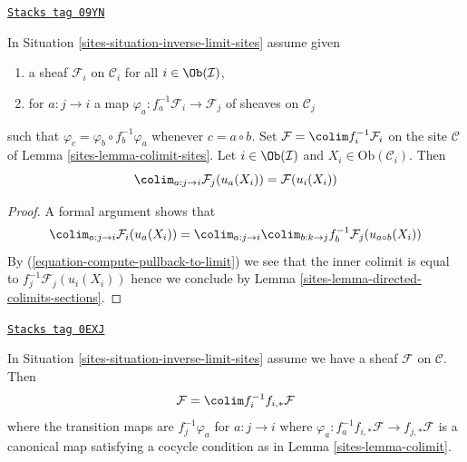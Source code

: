 \begin{lemma}[Colimit]
\label{sites-lemma-colimit}
\href{https://stacks.math.columbia.edu/tag/09YN}{\texttt{Stacks tag 09YN}}

In Situation \ref{sites-situation-inverse-limit-sites} assume given
\begin{enumerate}
\item a sheaf $\mathcal{F}_i$ on $\mathcal{C}_i$ for all
$i \in \Ob(\mathcal{I})$,
\item for $a : j \to i$ a map
$\varphi_a : f_a^{-1}\mathcal{F}_i \to \mathcal{F}_j$
of sheaves on $\mathcal{C}_j$
\end{enumerate}
such that $\varphi_c = \varphi_b \circ f_b^{-1}\varphi_a$
whenever $c = a \circ b$. Set $\mathcal{F} = \colim f_i^{-1}\mathcal{F}_i$
on the site $\mathcal{C}$ of Lemma \ref{sites-lemma-colimit-sites}.
Let $i \in \Ob(\mathcal{I})$ and $X_i \in \text{Ob}(\mathcal{C}_i)$. Then
$$
\colim_{a : j \to i} \mathcal{F}_j(u_a(X_i)) = \mathcal{F}(u_i(X_i))
$$
\end{lemma}

\begin{proof}

A formal argument shows that
$$
\colim_{a : j \to i} \mathcal{F}_i(u_a(X_i)) =
\colim_{a : j \to i} \colim_{b : k \to j}
f_b^{-1}\mathcal{F}_j(u_{a \circ b}(X_i))
$$
By (\ref{equation-compute-pullback-to-limit})
we see that the inner colimit is equal to
$f_j^{-1}\mathcal{F}_j(u_i(X_i))$ hence we conclude by
Lemma \ref{sites-lemma-directed-colimits-sections}.
\end{proof}

\begin{lemma}
\label{sites-lemma-colimit-push-pull}
\href{https://stacks.math.columbia.edu/tag/0EXJ}{\texttt{Stacks tag 0EXJ}}

In Situation \ref{sites-situation-inverse-limit-sites} assume
we have a sheaf $\mathcal{F}$ on $\mathcal{C}$. Then
$$
\mathcal{F} = \colim f_i^{-1}f_{i, *}\mathcal{F}
$$
where the transition maps are $f_j^{-1}\varphi_a$
for $a : j \to i$ where
$\varphi_a : f_a^{-1}f_{i, *}\mathcal{F} \to f_{j, *}\mathcal{F}$
is a canonical map
satisfying a cocycle condition as in Lemma \ref{sites-lemma-colimit}.
\end{lemma}

